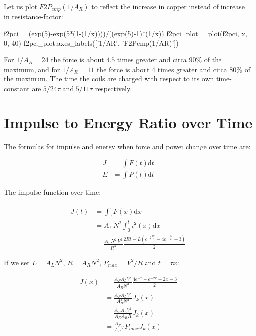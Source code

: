 \documentclass[]{../common/elementary-physics}
\begin{document}
Let us plot $F2P_{cmp}(1/A_R)$ to reflect the increase in copper instead of increase in resistance-factor:

\begin{sagesilent}
f2pci = (exp(5)-exp(5*(1-(1/x))))/((exp(5)-1)*(1/x))
f2pci_plot = plot(f2pci, x, 0, 40)
f2pci_plot.axes_labels(['1/AR', 'F2Pcmp(1/AR)'])
\end{sagesilent}


For $1/A_R = 24$ the force is about $4.5$ times greater and circa $90 \percent$ of the maximum, and for $1/A_R = 11$ the force is about $4$ times greater and circa $80 \percent$ of the maximum. The time the coils are charged with respect to its own time-constant are $5/24 \tau$ and $5/11 \tau$ respectively.

\section{Impulse to Energy Ratio over Time}

The formulas for impulse and energy when force and power change over time are:

\begin{subequations}
\begin{align}
J &= \int F(t) \mathrm{d}t \\
E &= \int P(t) \mathrm{d}t
\end{align}
\end{subequations}

The impulse function over time:

\begin{subequations}
\begin{align}
J(t) &= \int^t_0 F(x) \mathrm{d}x \\
&= A_F \, N^2 \int^t_0 i^2(x) \mathrm{d}x \\
&= \frac{A_F \, N^2 \, V^2}{R^3} \frac{2 R t - L (e^{-2 \frac{R t}{L}} - 4 e^{-\frac{R t}{L}} + 3)}{2}
\end{align}
\end{subequations}

If we set $L = A_L N^2$, $R = A_R N^2$, $P_{max} = V^2 / R$ and $t = \tau x$:

\begin{subequations}
\begin{align}
J(x) &= \frac{A_F A_L V^2}{A_R N^3} \frac{4 e^{-x}-e^{-2x}+2x-3}{2} \\
&= \frac{A_F A_L V^2}{A_R^3 N^2} J_k(x) \\
&= \frac{A_F A_L V^2}{A_R A_R R} J_k(x) \\
&= \frac{A_F}{A_R} \tau P_{max} J_k(x)
\end{align}
\end{subequations}
\end{document}
